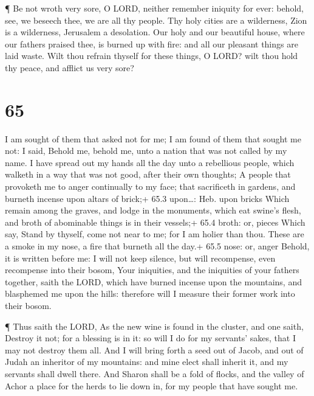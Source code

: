  ¶ Be not wroth very sore, O LORD, neither remember iniquity
for ever: behold, see, we beseech thee, we are all thy people.
 Thy holy cities are a wilderness, Zion is a wilderness,
Jerusalem a desolation.  Our holy and our beautiful house,
where our fathers praised thee, is burned up with fire: and all our
pleasant things are laid waste.  Wilt thou refrain thyself
for these things, O LORD? wilt thou hold thy peace, and afflict us very
sore?

\hypertarget{section-64}{%
\section{65}\label{section-64}}

 I am sought of them that asked not for me; I am found of
them that sought me not: I said, Behold me, behold me, unto a nation
that was not called by my name.  I have spread out my hands
all the day unto a rebellious people, which walketh in a way that was
not good, after their own thoughts;  A people that provoketh
me to anger continually to my face; that sacrificeth in gardens, and
burneth incense upon altars of brick;+ 65.3 upon\ldots: Heb. upon bricks
 Which remain among the graves, and lodge in the monuments,
which eat swine's flesh, and broth of abominable things is in their
vessels;+ 65.4 broth: or, pieces  Which say, Stand by
thyself, come not near to me; for I am holier than thou. These are a
smoke in my nose, a fire that burneth all the day.+ 65.5 nose: or, anger
 Behold, it is written before me: I will not keep silence,
but will recompense, even recompense into their bosom,  Your
iniquities, and the iniquities of your fathers together, saith the LORD,
which have burned incense upon the mountains, and blasphemed me upon the
hills: therefore will I measure their former work into their bosom.

 ¶ Thus saith the LORD, As the new wine is found in the
cluster, and one saith, Destroy it not; for a blessing is in it: so will
I do for my servants' sakes, that I may not destroy them all.
 And I will bring forth a seed out of Jacob, and out of
Judah an inheritor of my mountains: and mine elect shall inherit it, and
my servants shall dwell there.  And Sharon shall be a fold
of flocks, and the valley of Achor a place for the herds to lie down in,
for my people that have sought me.

